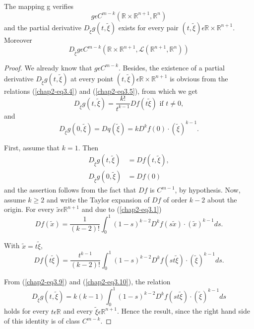 \begin{lemma}\label{chap2-lem3.3}
The mapping g verifies
$$
g \epsilon C^{m-k} (\mathbb{R} \times \mathbb{R}^{n+1}, \mathbb{R}^{n})
$$
and the partial derivative $D_{\widetilde{\xi}}g(t, \widetilde{\xi})$
exists for every pair $(t, \widetilde{\xi}) \epsilon \mathbb{R} \times
\mathbb{R}^{n+1}$. Moreover
$$
D_{\widetilde{\xi}}g \epsilon C^{m-k} (\mathbb{R} \times
\mathbb{R}^{n+1}, \mathscr{L}(\mathbb{R}^{n+1}, \mathbb{R}^{n}))
$$
\end{lemma}

\begin{proof}
We already know that $g \epsilon C^{m-k}$. Besides, the existence of a
partial derivative $D_{\widetilde{\xi}}g(t, \widetilde{\xi})$ at every
point $(t, \widetilde{\xi}) \epsilon \mathbb{R} \times
\mathbb{R}^{n+1}$ is obvious from the relations (\ref{chap2-eq3.4})
and (\ref{chap2-eq3.5}), from which we get 
\begin{equation*}
D_{\widetilde{\xi}}g(t, \widetilde{\xi}) = \frac{k!}{t^{k-1}}
Df(t\widetilde{\xi}) \text{ if } t \neq 0,\tag{3.9}\label{chap2-eq3.9}
\end{equation*}
and
\begin{equation*}
D_{\widetilde{\xi}}g(0, \widetilde{\xi}) = Dq(\widetilde{\xi}) =
kD^{k}f(0) \cdot (\widetilde{\xi})^{k-1}.\tag{3.10}\label{chap2-eq3.10}
\end{equation*}\pageoriginale

First, assume that $k = 1$. Then
\begin{align*}
D_{\widetilde{\xi}}g(t, \widetilde{\xi}) & = Df(t, \widetilde{\xi}),\\
D_{\widetilde{\xi}}g(0, \widetilde{\xi}) & = Df(0)
\end{align*}
and the assertion follows from the fact that $Df$ is $C^{m-1}$, by
hypothesis. Now, assume $k \geq 2$ and write the Taylor expansion of
$Df$ of order $k - 2$ about the origin. For every $\widetilde{x}
\epsilon \mathbb{R}^{n+1}$ and due to (\ref{chap2-eq3.1})
$$
Df(\widetilde{x}) = \frac{1}{(k-2)!} \int_{0}^{1} (1-s)^{k-2}
D^{k}f(s\widetilde{x}) \cdot (\widetilde{x})^{k-1} ds. 
$$

With $\widetilde{x} = t\widetilde{\xi}$,
$$
Df(t\widetilde{\xi}) = \frac{t^{k-1}}{(k-2)!} \int_{0}^{1} (1-s)^{k-2}
D^{k}f(st\widetilde{\xi}) \cdot (\widetilde{\xi})^{k-1} ds.
$$

From (\ref{chap2-eq3.9}) and (\ref{chap2-eq3.10}), the relation
\begin{equation*}
D_{\widetilde{\xi}}g(t, \widetilde{\xi}) = k(k-1) \int_{0}^{1} (1-s)^{k-2}
D^{k}f(st\widetilde{\xi})\cdot(\widetilde{\xi})^{k-1} ds
\end{equation*}
holds for every $t \epsilon \mathbb{R}$ and every $\widetilde{\xi}
\epsilon \mathbb{R}^{n+1}$. Hence the result, since the right hand
side of this identity is of class $C^{m-k}$.
\end{proof}


